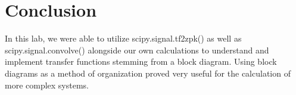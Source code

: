 \documentclass[11pt,a4,titlepage]{article}
\begin{document}
\section{Conclusion}
In this lab, we were able to utilize scipy.signal.tf2zpk() as well as scipy.signal.convolve() alongside our own calculations to understand and implement transfer functions stemming from a block diagram. Using block diagrams as a method of organization proved very useful for the calculation of more complex systems.
\end{document}
